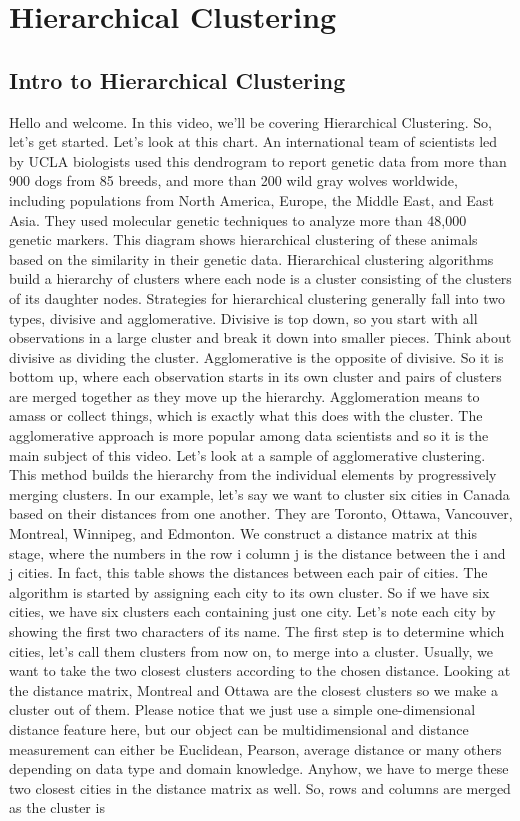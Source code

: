 \section{Hierarchical Clustering}

\subsection{Intro to Hierarchical Clustering}


Hello and welcome. In this video, we'll be covering Hierarchical Clustering. So, let's get started. Let's look at this chart. An international team of scientists led by UCLA biologists used this dendrogram to report genetic data from more than 900 dogs from 85 breeds, and more than 200 wild gray wolves worldwide, including populations from North America, Europe, the Middle East, and East Asia. They used molecular genetic techniques to analyze more than 48,000 genetic markers. This diagram shows hierarchical clustering of these animals based on the similarity in their genetic data. Hierarchical clustering algorithms build a hierarchy of clusters where each node is a cluster consisting of the clusters of its daughter nodes. Strategies for hierarchical clustering generally fall into two types, divisive and agglomerative. Divisive is top down, so you start with all observations in a large cluster and break it down into smaller pieces. Think about divisive as dividing the cluster. Agglomerative is the opposite of divisive. So it is bottom up, where each observation starts in its own cluster and pairs of clusters are merged together as they move up the hierarchy. Agglomeration means to amass or collect things, which is exactly what this does with the cluster. The agglomerative approach is more popular among data scientists and so it is the main subject of this video. Let's look at a sample of agglomerative clustering. This method builds the hierarchy from the individual elements by progressively merging clusters. In our example, let's say we want to cluster six cities in Canada based on their distances from one another. They are Toronto, Ottawa, Vancouver, Montreal, Winnipeg, and Edmonton. We construct a distance matrix at this stage, where the numbers in the row i column j is the distance between the i and j cities. In fact, this table shows the distances between each pair of cities. The algorithm is started by assigning each city to its own cluster. So if we have six cities, we have six clusters each containing just one city. Let's note each city by showing the first two characters of its name. The first step is to determine which cities, let's call them clusters from now on, to merge into a cluster. Usually, we want to take the two closest clusters according to the chosen distance. Looking at the distance matrix, Montreal and Ottawa are the closest clusters so we make a cluster out of them. Please notice that we just use a simple one-dimensional distance feature here, but our object can be multidimensional and distance measurement can either be Euclidean, Pearson, average distance or many others depending on data type and domain knowledge. Anyhow, we have to merge these two closest cities in the distance matrix as well. So, rows and columns are merged as the cluster is 